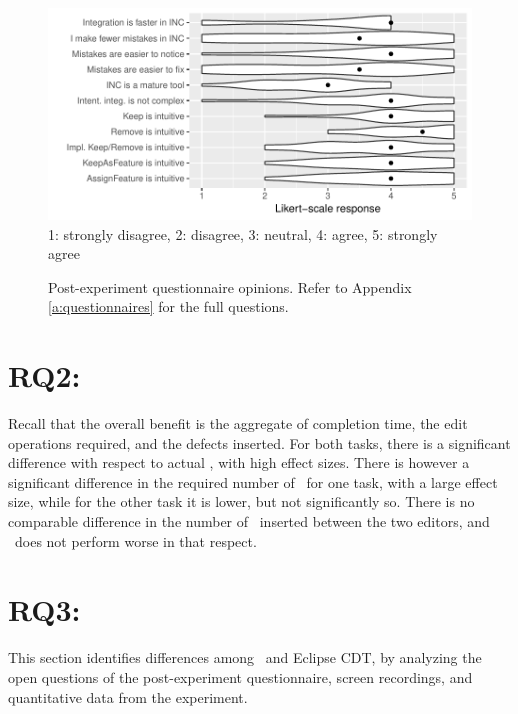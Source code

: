 \begin{figure}[ht]
    \centering
    \includegraphics{figure/incl-exit-quantitative.pdf}
    1: strongly disagree, 2: disagree, 3: neutral, 4: agree, 5: strongly agree
    \caption{Post-experiment questionnaire opinions. Refer to Appendix \ref{a:questionnaires} for the full questions.}
    \label{fig:maturity}
\end{figure}

\section{RQ2: \RQB}
Recall that the overall benefit is the aggregate of completion time, the edit operations required, and the defects inserted. For both tasks, there is a significant difference with respect to actual \ctime, with high effect sizes. There is however a significant difference in the required number of \eops~for one task, with a large effect size, while for the other task it is lower, but not significantly so. There is no comparable difference in the number of ~inserted between the two editors, and \tooln~does not perform worse in that respect.


\section{RQ3: \RQC}
This section identifies differences among \tooln~and Eclipse CDT, by analyzing the open questions of the post-experiment questionnaire, screen recordings, and quantitative data from the experiment. 

